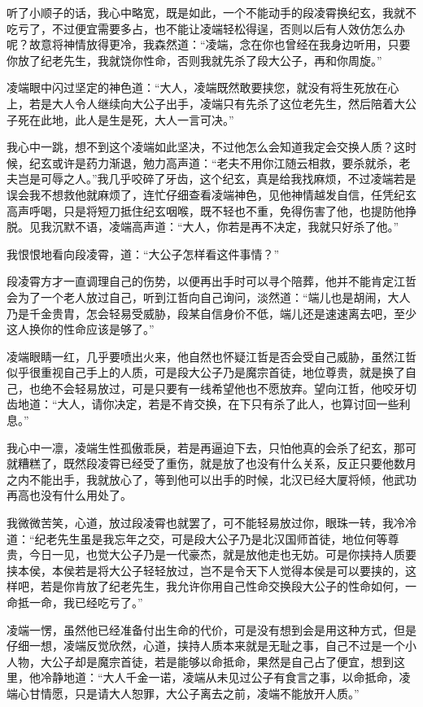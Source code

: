 听了小顺子的话，我心中略宽，既是如此，一个不能动手的段凌霄换纪玄，我就不吃亏了，不过便宜需要多占，也不能让凌端轻松得逞，否则以后有人效仿怎么办呢？故意将神情放得更冷，我森然道：“凌端，念在你也曾经在我身边听用，只要你放了纪老先生，我就饶你性命，否则我就先杀了段大公子，再和你周旋。”

凌端眼中闪过坚定的神色道：“大人，凌端既然敢要挟您，就没有将生死放在心上，若是大人令人继续向大公子出手，凌端只有先杀了这位老先生，然后陪着大公子死在此地，此人是生是死，大人一言可决。”

我心中一跳，想不到这个凌端如此坚决，不过他怎么会知道我定会交换人质？这时候，纪玄或许是药力渐退，勉力高声道：“老夫不用你江随云相救，要杀就杀，老夫岂是可辱之人。”我几乎咬碎了牙齿，这个纪玄，真是给我找麻烦，不过凌端若是误会我不想救他就麻烦了，连忙仔细查看凌端神色，见他神情越发自信，任凭纪玄高声呼喝，只是将短刀抵住纪玄咽喉，既不轻也不重，免得伤害了他，也提防他挣脱。见我沉默不语，凌端高声道：“大人，你若是再不决定，我就只好杀了他。”

我恨恨地看向段凌霄，道：“大公子怎样看这件事情？”

段凌霄方才一直调理自己的伤势，以便再出手时可以寻个陪葬，他并不能肯定江哲会为了一个老人放过自己，听到江哲向自己询问，淡然道：“端儿也是胡闹，大人乃是千金贵胄，怎会轻易受威胁，段某自信身价不低，端儿还是速速离去吧，至少这人换你的性命应该是够了。”

凌端眼睛一红，几乎要喷出火来，他自然也怀疑江哲是否会受自己威胁，虽然江哲似乎很重视自己手上的人质，可是段大公子乃是魔宗首徒，地位尊贵，就是换了自己，也绝不会轻易放过，可是只要有一线希望他也不愿放弃。望向江哲，他咬牙切齿地道：“大人，请你决定，若是不肯交换，在下只有杀了此人，也算讨回一些利息。”

我心中一凛，凌端生性孤傲乖戾，若是再逼迫下去，只怕他真的会杀了纪玄，那可就糟糕了，既然段凌霄已经受了重伤，就是放了也没有什么关系，反正只要他数月之内不能出手，我就放心了，等到他可以出手的时候，北汉已经大厦将倾，他武功再高也没有什么用处了。

我微微苦笑，心道，放过段凌霄也就罢了，可不能轻易放过你，眼珠一转，我冷冷道：“纪老先生虽是我忘年之交，可是段大公子乃是北汉国师首徒，地位何等尊贵，今日一见，也觉大公子乃是一代豪杰，就是放他走也无妨。可是你挟持人质要挟本侯，本侯若是将大公子轻轻放过，岂不是令天下人觉得本侯是可以要挟的，这样吧，若是你肯放了纪老先生，我允许你用自己性命交换段大公子的性命如何，一命抵一命，我已经吃亏了。”

凌端一愣，虽然他已经准备付出生命的代价，可是没有想到会是用这种方式，但是仔细一想，凌端反觉欣然，心道，挟持人质本来就是无耻之事，自己不过是一个小人物，大公子却是魔宗首徒，若是能够以命抵命，果然是自己占了便宜，想到这里，他冷静地道：“大人千金一诺，凌端从未见过公子有食言之事，以命抵命，凌端心甘情愿，只是请大人恕罪，大公子离去之前，凌端不能放开人质。”

